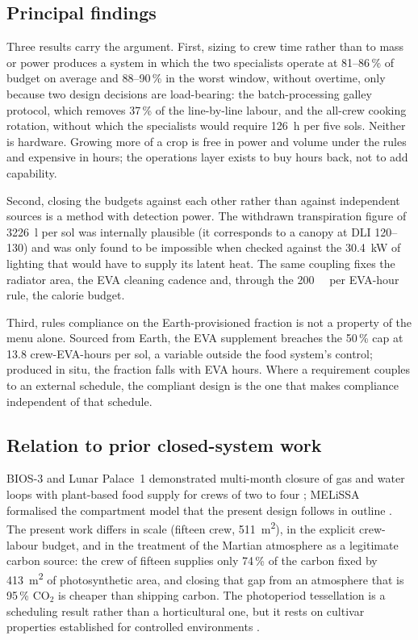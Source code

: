 \documentclass[11pt,a4paper,3p,authoryear]{elsarticle}
\begin{document}
\subsection{Principal findings}

Three results carry the argument. First, sizing to crew time rather than to mass or power produces a system in which the two specialists operate at 81--86\,\% of budget on average and 88--90\,\% in the worst window, without overtime, only because two design decisions are load-bearing: the batch-processing galley protocol, which removes 37\,\% of the line-by-line labour, and the all-crew cooking rotation, without which the specialists would require \SI{126}{\hour} per five sols. Neither is hardware. Growing more of a crop is free in power and volume under the rules and expensive in hours; the operations layer exists to buy hours back, not to add capability.

Second, closing the budgets against each other rather than against independent sources is a method with detection power. The withdrawn transpiration figure of \SI{3226}{\litre} per sol was internally plausible (it corresponds to a canopy at DLI 120--130) and was only found to be impossible when checked against the \SI{30.4}{\kilo\watt} of lighting that would have to supply its latent heat. The same coupling fixes the radiator area, the EVA cleaning cadence and, through the \SI{200}{\kilo\calorie} per EVA-hour rule, the calorie budget.

Third, rules compliance on the Earth-provisioned fraction is not a property of the menu alone. Sourced from Earth, the EVA supplement breaches the 50\,\% cap at 13.8 crew-EVA-hours per sol, a variable outside the food system's control; produced in situ, the fraction falls with EVA hours. Where a requirement couples to an external schedule, the compliant design is the one that makes compliance independent of that schedule.

\subsection{Relation to prior closed-system work}

BIOS-3 and Lunar Palace~1 demonstrated multi-month closure of gas and water loops with plant-based food supply for crews of two to four \citep{Gitelson1989bios3,Fu2016lunarpalace}; MELiSSA formalised the compartment model that the present design follows in outline \citep{Lasseur2010melissa}. The present work differs in scale (fifteen crew, \SI{511}{\metre\squared}), in the explicit crew-labour budget, and in the treatment of the Martian atmosphere as a legitimate carbon source: the crew of fifteen supplies only 74\,\% of the carbon fixed by \SI{413}{\metre\squared} of photosynthetic area, and closing that gap from an atmosphere that is 95\,\% CO$_2$ is cheaper than shipping carbon. The photoperiod tessellation is a scheduling result rather than a horticultural one, but it rests on cultivar properties established for controlled environments \citep{Bugbee1997apogee}.
\end{document}
